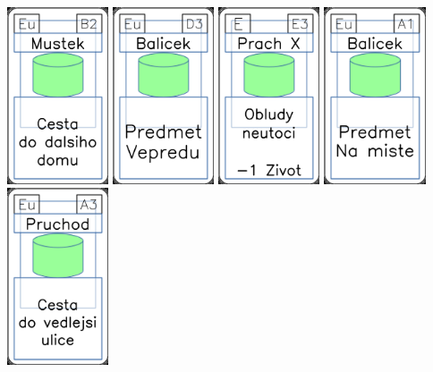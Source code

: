 \documentclass[a4paper]{article}
\begin{document}
	\includegraphics[width=3.0cm]{img-4_36}
	\includegraphics[width=3.0cm]{img-4_17}
	\includegraphics[width=3.0cm]{img-4_52}
	\includegraphics[width=3.0cm]{img-4_30}
	\includegraphics[width=3.0cm]{img-4_32}
\end{document}
